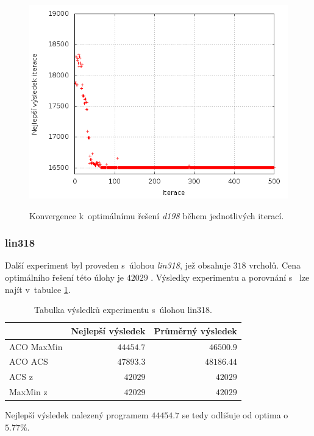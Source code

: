 \documentclass[a4paper, 12pt]{article}
\begin{document}
\begin{figure}[bt]
\begin{center}
\scalebox{0.6}
{
  \includegraphics{imgs/best.png}
}
\caption{
Konvergence k~optimálnímu řešení \emph{d198} během jednotlivých iterací.}
\label{fig:best}
\end{center}
\end{figure}

\subsubsection{lin318}
Další experiment byl proveden s~úlohou \emph{lin318}, jež obsahuje $318$ vrcholů. Cena optimálního řešení této úlohy je $42029$ \cite{aco:acs}. Výsledky experimentu
a porovnání s~\cite{aco:maxmintsp,aco:acs} lze najít v~tabulce \ref{tablin318}.
\begin{table}[tb]
\begin{center}
  \begin{tabular}{ | l | r | r |}
   \hline
    & \textbf{Nejlepší výsledek} & \textbf{Průměrný výsledek} \\ \hline \hline
    ACO MaxMin &$44454.7$ & $46500.9$ \\ \hline
    ACO ACS & $47893.3$ & $48186.44$ \\ \hline
    ACS z~\cite{aco:acs} & $42 029$ & $42 029$ \\ \hline
    MaxMin z~\cite{aco:maxmintsp} & $42 029$ & $42 029$\\ \hline
   \end{tabular}
   \caption{Tabulka výsledků experimentu s~úlohou lin318.}
   \label{tablin318}
\end{center}
\end{table}
Nejlepší výsledek nalezený programem $44454.7$ se tedy odlišuje od optima o~$5.77\%$.
\end{document}
